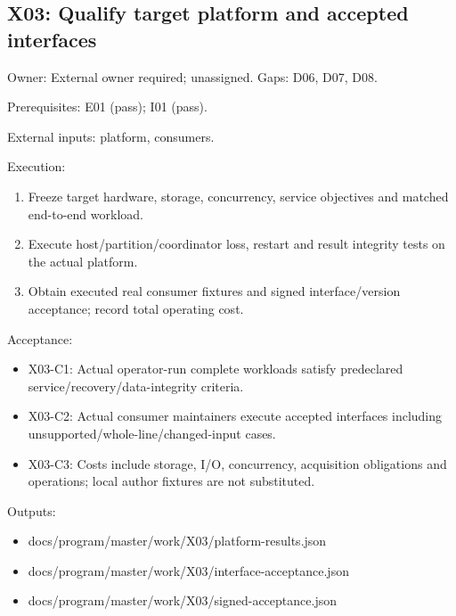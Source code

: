 \documentclass[
  11pt,
  a4paper,
]{article}
\providecommand{\tightlist}{%
  \setlength{\itemsep}{0pt}\setlength{\parskip}{0pt}}
\begin{document}
\hypertarget{x03-qualify-target-platform-and-accepted-interfaces}{%
\subsection{X03: Qualify target platform and accepted
interfaces}\label{x03-qualify-target-platform-and-accepted-interfaces}}

Owner: External owner required; unassigned. Gaps: D06, D07, D08.

Prerequisites: E01 (pass); I01 (pass).

External inputs: platform, consumers.

Execution:

\begin{enumerate}
\def\labelenumi{\arabic{enumi}.}
\tightlist
\item
  Freeze target hardware, storage, concurrency, service objectives and
  matched end-to-end workload.
\item
  Execute host/partition/coordinator loss, restart and result integrity
  tests on the actual platform.
\item
  Obtain executed real consumer fixtures and signed interface/version
  acceptance; record total operating cost.
\end{enumerate}

Acceptance:

\begin{itemize}
\tightlist
\item
  X03-C1: Actual operator-run complete workloads satisfy predeclared
  service/recovery/data-integrity criteria.
\item
  X03-C2: Actual consumer maintainers execute accepted interfaces
  including unsupported/whole-line/changed-input cases.
\item
  X03-C3: Costs include storage, I/O, concurrency, acquisition
  obligations and operations; local author fixtures are not substituted.
\end{itemize}

Outputs:

\begin{itemize}
\tightlist
\item
  docs/program/master/work/X03/platform-results.json
\item
  docs/program/master/work/X03/interface-acceptance.json
\item
  docs/program/master/work/X03/signed-acceptance.json
\end{itemize}
\end{document}
